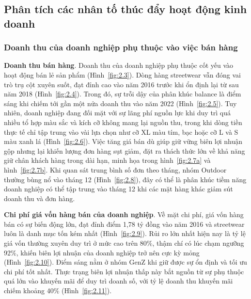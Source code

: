 \documentclass{article}
\begin{document}
\subsection{Phân tích các nhân tố thúc đẩy hoạt động kinh doanh}
\subsubsection{Doanh thu của doanh nghiệp phụ thuộc vào việc bán hàng}
\textbf{Doanh thu bán hàng}. Doanh thu của doanh nghiệp phụ thuộc cốt yếu vào hoạt động bán lẻ sản phẩm (Hình~\ref{fig:2.3}). Dòng hàng streetwear vẫn đóng vai trò trụ cột xuyên suốt, đạt đỉnh cao vào năm 2016 trước khi ổn định lại từ sau năm 2018 (Hình~\ref{fig:2.4}). Trong đó, sự trỗi dậy của phân khúc balance là điểm sáng khi chiếm tới gần một nửa doanh thu vào năm 2022 (Hình~\ref{fig:2.5}). Tuy nhiên, doanh nghiệp đang đối mặt với sự lãng phí nguồn lực khi duy trì quá nhiều tổ hợp màu sắc và kích cỡ không mang lại nguồn thu, trong khi dòng tiền thực tế chỉ tập trung vào vài lựa chọn như cỡ XL màu tím, bạc hoặc cỡ L và S màu xanh lá (Hình~\ref{fig:2.6}). Việc tăng giá bán dù giúp giữ vững biên lợi nhuận gộp nhưng lại khiến lượng đơn hàng sụt giảm, đặt ra thách thức lớn về khả năng giữ chân khách hàng trong dài hạn, minh họa trong hình~\ref{fig:2.7a} và hình~\ref{fig:2.7b}. Khi quan sát trung bình số đơn theo tháng, nhóm Outdoor thường bùng nổ vào tháng 12    (Hình~\ref{fig:2.8}), đây có thể là phân khúc tiềm năng doanh nghiệp có thể tập trung vào tháng 12 khi các mặt hàng khác giảm sút doanh thu và đơn hàng.

\textbf{Chi phí giá vốn hàng bán của doanh nghiệp}. Về mặt chi phí, giá vốn hàng bán có sự biến động lớn, đạt đỉnh điểm 1,78 tỷ đồng vào năm 2016 và streetwear luôn là danh mục tốn kém nhất (Hình~\ref{fig:2.9}). Rủi ro lớn nhất hiện nay là tỷ lệ giá vốn thường xuyên duy trì ở mức cao trên 80\%, thậm chí có lúc chạm ngưỡng 92\%, khiến biên lợi nhuận của doanh nghiệp trở nên cực kỳ mỏng (Hình~\ref{fig:2.10}). Điểm sáng nằm ở nhóm GenZ khi giữ được sự ổn định và tối ưu chi phí tốt nhất. Thực trạng biên lợi nhuận thấp này bắt nguồn từ sự phụ thuộc quá lớn vào khuyến mãi để duy trì doanh số, với tỷ lệ doanh thu khuyến mãi chiếm khoảng 40\% (Hình~\ref{fig:2.11}).
\end{document}
